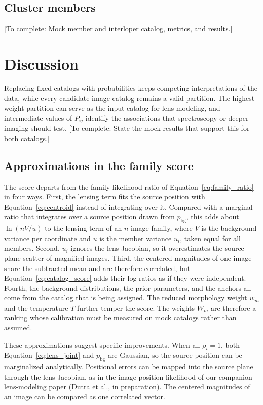 \documentclass[twocolumn,twocolappendix,linenumbers]{aastex701}
\newcommand{\bg}{\mathrm{bg}}
\newcommand{\todo}[1]{\textcolor{red!65!black}{[To complete: #1]}}
\begin{document}
\subsection{Cluster members}
\label{sec:test_members}
\todo{Mock member and interloper catalog, metrics, and results.}

\section{Discussion}
\label{sec:discussion}
Replacing fixed catalogs with probabilities keeps competing interpretations of the data, while every candidate image catalog remains a valid partition.
The highest-weight partition can serve as the input catalog for lens modeling, and intermediate values of $P_{ij}$ identify the associations that spectroscopy or deeper imaging should test.
\todo{State the mock results that support this for both catalogs.}

\subsection{Approximations in the family score}
\label{sec:disc_families}
The score departs from the family likelihood ratio of Equation~\ref{eq:family_ratio} in four ways.
First, the lensing term fits the source position with Equation~\ref{eq:centroid} instead of integrating over it.
Compared with a marginal ratio that integrates over a source position drawn from $p_{\bg}$, this adds about $\ln(nV/u)$ to the lensing term of an $n$-image family, where $V$ is the background variance per coordinate and $u$ is the member variance $u_i$, taken equal for all members.
Second, $u_i$ ignores the lens Jacobian, so it overestimates the source-plane scatter of magnified images.
Third, the centered magnitudes of one image share the subtracted mean and are therefore correlated, but Equation~\ref{eq:catalog_score} adds their log ratios as if they were independent.
Fourth, the background distributions, the prior parameters, and the anchors all come from the catalog that is being assigned.
The reduced morphology weight $w_m$ and the temperature $T$ further temper the score.
The weights $W_m$ are therefore a ranking whose calibration must be measured on mock catalogs rather than assumed.

These approximations suggest specific improvements.
When all $\rho_i=1$, both Equation~\ref{eq:lens_joint} and $p_{\bg}$ are Gaussian, so the source position can be marginalized analytically.
Positional errors can be mapped into the source plane through the lens Jacobian, as in the image-position likelihood of our companion lens-modeling paper (Dutra et al., in preparation).
The centered magnitudes of an image can be compared as one correlated vector.
\end{document}
